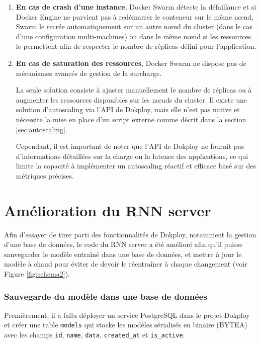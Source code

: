 \documentclass{rapportClass} %
\begin{document}
\begin{enumerate}
\item \textbf{En cas de crash d'une instance}, Docker Swarm détecte la
  défaillance et si Docker Engine ne parvient pas à redémarrer le
  conteneur sur le même nœud, Swarm le recrée automatiquement sur un
  autre nœud du cluster (dans le cas d'une configuration multi-machines)
  ou dans le même nœud si les ressources le permettent afin de respecter
  le nombre de réplicas défini pour l'application.


  \smallskip
\item 
  \textbf{En cas de saturation des ressources}, Docker Swarm ne dispose
  pas de mécanismes avancés de gestion de la surcharge.

  \smallskip
  La seule solution consiste à ajuster manuellement le nombre de
  réplicas ou à augmenter les ressources disponibles sur les nœuds du
  cluster. Il existe une solution d'autoscaling via l'API de Dokploy,
  mais elle n'est pas native et nécessite la mise en place d'un script
  externe comme décrit dans la section \ref{sec:autoscaling}.

  \smallskip
  Cependant, il est important de noter que l'API de Dokploy ne fournit
  pas d'informations détaillées sur la charge ou la latence des
  applications, ce qui limite la capacité à implémenter un autoscaling
  réactif et efficace basé sur des métriques précises.

\end{enumerate}

\section{Amélioration du RNN server}
Afin d'essayer de tirer parti des fonctionnalités de Dokploy, notamment la gestion d'une base de données, 
le code du RNN server a été amélioré afin qu'il puisse sauvegarder le modèle entraîné dans une base de données, 
et mettre à jour le modèle à chaud pour éviter de devoir le réentraîner à chaque changement (voir Figure \ref{fig:schema2}).

\subsubsection{Sauvegarde du modèle dans une base de données}
Premièrement, il a fallu déployer un service PostgreSQL dans le projet Dokploy et créer une table \texttt{models} 
qui stocke les modèles sérialisés en binaire (BYTEA) avec les champs \texttt{id}, \texttt{name}, \texttt{data}, 
\texttt{created\_at} et \texttt{is\_active}.
\end{document}
